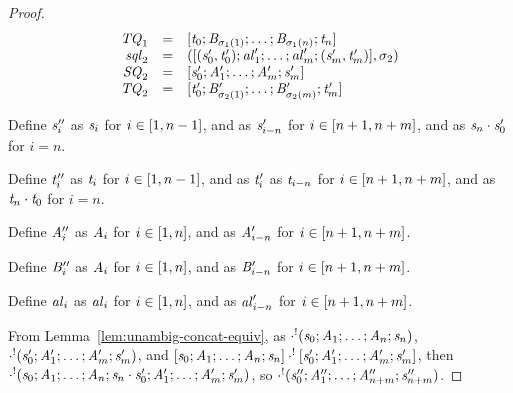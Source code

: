 \documentclass[numbers,10pt,preprint\ifanon ,nocopyrightspace\fi]{sigplanconf}
\begin{document}
\begin{proof}
\[\begin{array}{rcl}
      \mathit{TQ}_1 & = &
                           [\mathit{t}_0;\mathit{B}_{\sigma_1(1)};\ldots;\mathit{B}_{\sigma_1(n)};\mathit{t}_n]\\
      \mathit{sql}_2 & = &
                            ([(\mathit{s}_0',\mathit{t}_0');\mathit{al}_1';\ldots;\mathit{al}_m';(\mathit{s}_m',\mathit{t}_m')],\sigma_2)\\
      \mathit{SQ}_2 & = &
                        [\mathit{s}_0';\mathit{A}_1';\ldots;\mathit{A}_m';\mathit{s}_m']\\
      \mathit{TQ}_2 & = &
                           [\mathit{t}_0';\mathit{B}_{\sigma_2(1)}';\ldots;\mathit{B}_{\sigma_2(m)}';\mathit{t}_m']
    \end{array}
  \]

  Define $\mathit{s}_i''$ as $\mathit{s}_i$ for $i \in [1,n-1]$, and as
  $\mathit{s}_{i-n}'$ for $i \in [n+1,n+m]$, and as
  $\mathit{s}_n\cdot\mathit{s}_0'$ for $i=n$.

  Define $\mathit{t}_i''$ as $\mathit{t}_i$ for $i \in [1,n-1]$,
  and as $\mathit{t}_i'$ as $\mathit{t}_{i-n}$ for $i \in
  [n+1,n+m]$, and as $\mathit{t}_n\cdot\mathit{t}_0$ for $i=n$.

  Define $\mathit{A}_i''$ as $\mathit{A}_i$ for $i \in [1,n]$, and as
  $\mathit{A}_{i-n}'$ for $i \in [n+1,n+m]$.

  Define $\mathit{B}_i''$ as $\mathit{A}_i$ for $i \in [1,n]$, and as
  $\mathit{B}_{i-n}'$ for $i \in [n+1,n+m]$.

  Define $\mathit{al}_i$ as $\mathit{al}_i$ for $i \in [1,n]$, and as
  $\mathit{al}_{i-n}'$ for $i \in [n+1,n+m]$.

  From Lemma~\ref{lem:unambig-concat-equiv}, as
  $\cdot^!(\mathit{s}_0;\mathit{A}_1;\ldots;\mathit{A}_n;\mathit{s}_n)$,
  $\cdot^!(\mathit{s}_0';\mathit{A}_1';\ldots;\mathit{A}_m';\mathit{s}_m')$,
  and
  $[\mathit{s}_0;\mathit{A}_1;\ldots;\mathit{A}_n;\mathit{s}_n] \cdot^! [\mathit{s}_0';\mathit{A}_1';\ldots;\mathit{A}_m';\mathit{s}_m']$,
  then $\cdot^!(\mathit{s}_0;\mathit{A}_1;\ldots;\mathit{A}_n;
    \mathit{s}_n\cdot\mathit{s}_0';
    \mathit{A}_1';\ldots;\mathit{A}_m';\mathit{s}_m')$, so
  $\cdot^!(\mathit{s}_0'';\mathit{A}_1'';\ldots;\mathit{A}_{n+m}'';\mathit{s}_{n+m}'')$.


\end{proof}
\end{document}
